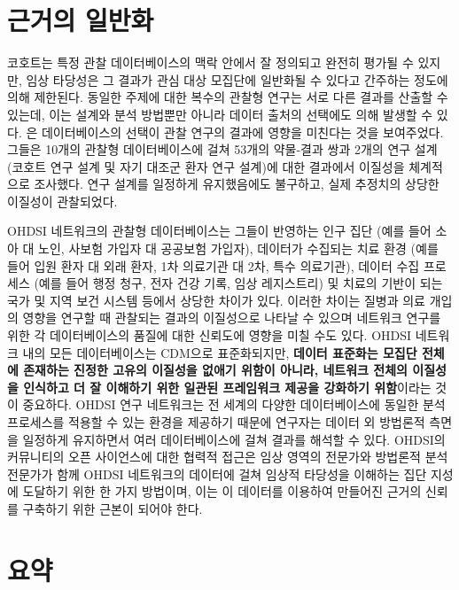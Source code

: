 \documentclass[10.5pt]{book}
\theoremstyle{definition}
\theoremstyle{definition}
\theoremstyle{definition}
\theoremstyle{remark}
\begin{document}
\section{근거의 일반화}\label{GeneralizabilityOfEvidence}

코호트는 특정 관찰 데이터베이스의 맥락 안에서 잘 정의되고 완전히 평가될
수 있지만, 임상 타당성은 그 결과가 관심 대상 모집단에 일반화될 수 있다고
간주하는 정도에 의해 제한된다. 동일한 주제에 대한 복수의 관찰형 연구는
서로 다른 결과를 산출할 수 있는데, 이는 설계와 분석 방법뿐만 아니라
데이터 출처의 선택에도 의해 발생할 수 있다. \citet{madigan_2013} 은
데이터베이스의 선택이 관찰 연구의 결과에 영향을 미친다는 것을
보여주었다. 그들은 10개의 관찰형 데이터베이스에 걸쳐 53개의 약물-결과
쌍과 2개의 연구 설계 (코호트 연구 설계 및 자기 대조군 환자 연구 설계)에
대한 결과에서 이질성을 체계적으로 조사했다. 연구 설계를 일정하게
유지했음에도 불구하고, 실제 추정치의 상당한 이질성이 관찰되었다.

OHDSI 네트워크의 관찰형 데이터베이스는 그들이 반영하는 인구 집단 (예를
들어 소아 대 노인, 사보험 가입자 대 공공보험 가입자), 데이터가 수집되는
치료 환경 (예를 들어 입원 환자 대 외래 환자, 1차 의료기관 대 2차, 특수
의료기관), 데이터 수집 프로세스 (예를 들어 행정 청구, 전자 건강 기록,
임상 레지스트리) 및 치료의 기반이 되는 국가 및 지역 보건 시스템 등에서
상당한 차이가 있다. 이러한 차이는 질병과 의료 개입의 영향을 연구할 때
관찰되는 결과의 이질성으로 나타날 수 있으며 네트워크 연구를 위한 각
데이터베이스의 품질에 대한 신뢰도에 영향을 미칠 수도 있다. OHDSI
네트워크 내의 모든 데이터베이스는 CDM으로 표준화되지만, \textbf{데이터
표준화는 모집단 전체에 존재하는 진정한 고유의 이질성을 없애기 위함이
아니라, 네트워크 전체의 이질성을 인식하고 더 잘 이해하기 위한 일관된
프레임워크 제공을 강화하기 위함}이라는 것이 중요하다. OHDSI 연구
네트워크는 전 세계의 다양한 데이터베이스에 동일한 분석 프로세스를 적용할
수 있는 환경을 제공하기 때문에 연구자는 데이터 외 방법론적 측면을
일정하게 유지하면서 여러 데이터베이스에 걸쳐 결과를 해석할 수 있다.
OHDSI의 커뮤니티의 오픈 사이언스에 대한 협력적 접근은 임상 영역의
전문가와 방법론적 분석 전문가가 함께 OHDSI 네트워크의 데이터에 걸쳐
임상적 타당성을 이해하는 집단 지성에 도달하기 위한 한 가지 방법이며,
이는 이 데이터를 이용하여 만들어진 근거의 신뢰를 구축하기 위한 근본이
되어야 한다.

\section{요약}\label{-14}
\end{document}
